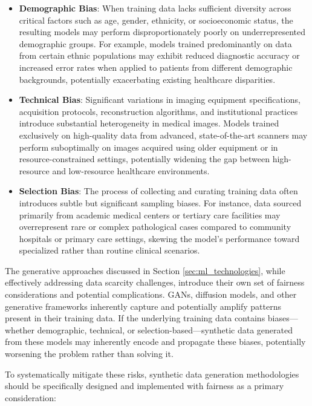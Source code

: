 \documentclass{article}
\begin{document}
\begin{itemize}
    \item \textbf{Demographic Bias}: When training data lacks sufficient diversity across critical factors such as age, gender, ethnicity, or socioeconomic status, the resulting models may perform disproportionately poorly on underrepresented demographic groups. For example, models trained predominantly on data from certain ethnic populations may exhibit reduced diagnostic accuracy or increased error rates when applied to patients from different demographic backgrounds, potentially exacerbating existing healthcare disparities.
    
    \item \textbf{Technical Bias}: Significant variations in imaging equipment specifications, acquisition protocols, reconstruction algorithms, and institutional practices introduce substantial heterogeneity in medical images. Models trained exclusively on high-quality data from advanced, state-of-the-art scanners may perform suboptimally on images acquired using older equipment or in resource-constrained settings, potentially widening the gap between high-resource and low-resource healthcare environments.
    
    \item \textbf{Selection Bias}: The process of collecting and curating training data often introduces subtle but significant sampling biases. For instance, data sourced primarily from academic medical centers or tertiary care facilities may overrepresent rare or complex pathological cases compared to community hospitals or primary care settings, skewing the model's performance toward specialized rather than routine clinical scenarios.
\end{itemize}

The generative approaches discussed in Section \ref{sec:ml_technologies}, while effectively addressing data scarcity challenges, introduce their own set of fairness considerations and potential complications. GANs, diffusion models, and other generative frameworks inherently capture and potentially amplify patterns present in their training data. If the underlying training data contains biases—whether demographic, technical, or selection-based—synthetic data generated from these models may inherently encode and propagate these biases, potentially worsening the problem rather than solving it.

To systematically mitigate these risks, synthetic data generation methodologies should be specifically designed and implemented with fairness as a primary consideration:
\end{document}
